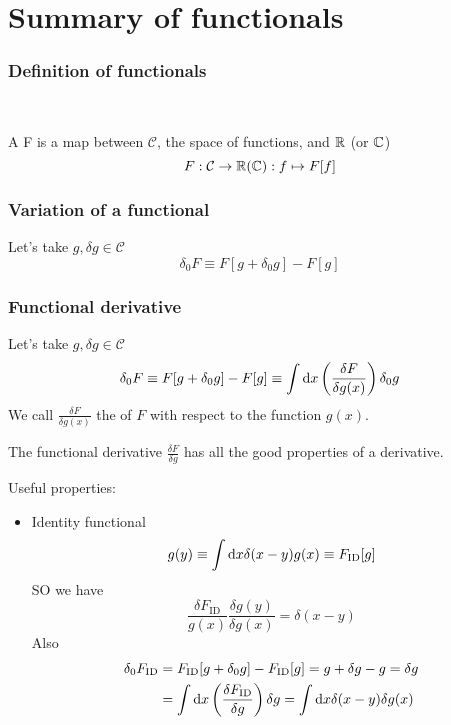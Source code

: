\section{Summary of functionals}
\subsubsection{Definition of functionals}\mbox{} \\

\begin{definition}
A  F is a map between $\mathcal{C}$, the space of functions, and $\mathbb{R}$ (or $\mathbb{C}$)
\[ F: \mathcal{C} \to \mathbb{R}(\mathbb{C}): f \mapsto F[f] \]
\end{definition}

\subsubsection{Variation of a functional}
Let's take $g, \delta g \in \mathcal{C}$
\[ \delta_0 F \equiv F[g+\delta_0 g] - F[g]\]

\subsubsection{Functional derivative}
Let's take $g, \delta g \in \mathcal{C}$
\[ \delta_0 F \equiv F[g+\delta_0 g] - F[g] \equiv \int \operatorname{d \!}{x} \left(\frac{\delta F}{\delta g(x)}\right)\delta_0 g \]
We call $\frac{\delta F}{\delta g(x)}$ the  of $F$ with respect to the function $g(x)$.

\begin{eigenschap}
The functional derivative $\frac{\delta F}{\delta g}$ has all the good properties of a derivative.
\end{eigenschap}

Useful properties:
\begin{itemize}
\item Identity functional
\[ g(y) \equiv \int \operatorname{d \!}{x}\delta(x-y)g(x) \equiv F_\text{ID}[g] \]
SO we have
\[ \frac{\delta F_\text{ID}}{g(x)}\frac{\delta g(y)}{\delta g(x)} = \delta(x-y) \]
Also
\begin{align*}
\delta_0F_\text{ID} &= F_\text{ID}[g+\delta_0 g] - F_\text{ID}[g] = g + \delta g - g = \delta g \\
&= \int \operatorname{d \!}{x}\left(\frac{\delta F_\text{ID}}{\delta g}\right)\delta g = \int \operatorname{d \!}{x} \delta(x-y)\delta g(x)
\end{align*}


\end{itemize}

